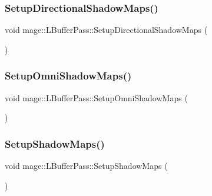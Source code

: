 \hypertarget{structmage_1_1_l_buffer_pass_aa6a3dd241588a460e2ea51f6cec14aeb}{}\label{structmage_1_1_l_buffer_pass_aa6a3dd241588a460e2ea51f6cec14aeb} 
\subsubsection{\texorpdfstring{Setup\+Directional\+Shadow\+Maps()}{SetupDirectionalShadowMaps()}}
{\footnotesize\ttfamily void mage\+::\+L\+Buffer\+Pass\+::\+Setup\+Directional\+Shadow\+Maps (\begin{DoxyParamCaption}{ }\end{DoxyParamCaption})\hspace{0.3cm}{\ttfamily [private]}}

\hypertarget{structmage_1_1_l_buffer_pass_a530276d14da57710e5182abda48982d4}{}\label{structmage_1_1_l_buffer_pass_a530276d14da57710e5182abda48982d4} 
\subsubsection{\texorpdfstring{Setup\+Omni\+Shadow\+Maps()}{SetupOmniShadowMaps()}}
{\footnotesize\ttfamily void mage\+::\+L\+Buffer\+Pass\+::\+Setup\+Omni\+Shadow\+Maps (\begin{DoxyParamCaption}{ }\end{DoxyParamCaption})\hspace{0.3cm}{\ttfamily [private]}}

\hypertarget{structmage_1_1_l_buffer_pass_ac646805ddf0eb4d81be3e29fec539fc5}{}\label{structmage_1_1_l_buffer_pass_ac646805ddf0eb4d81be3e29fec539fc5} 
\subsubsection{\texorpdfstring{Setup\+Shadow\+Maps()}{SetupShadowMaps()}}
{\footnotesize\ttfamily void mage\+::\+L\+Buffer\+Pass\+::\+Setup\+Shadow\+Maps (\begin{DoxyParamCaption}{ }\end{DoxyParamCaption})\hspace{0.3cm}{\ttfamily [private]}}

